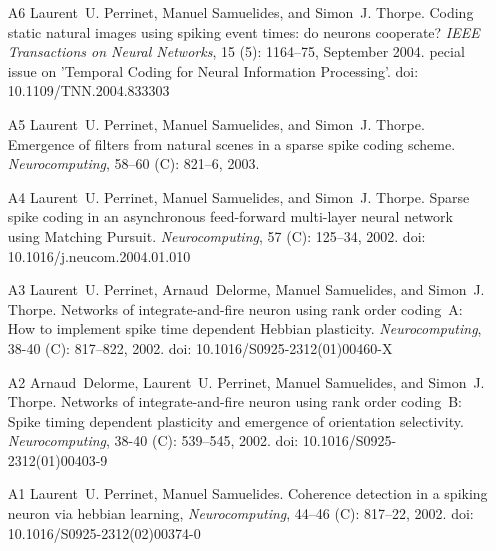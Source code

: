 \documentclass[11pt,french,a4paper,oneside]{article}%
\newcommand{\years}[1]{\marginpar{\textit{\scriptsize #1}}}
\providecommand{\doi}[1]{doi: #1}%
\begin{document}
\begin{enumerate}
\item[A6] %
Laurent~U. Perrinet, Manuel Samuelides, and Simon~J. Thorpe.
\newblock Coding static natural images using spiking event times: do neurons
  cooperate?
\newblock \emph{I{EEE} {T}ransactions on {N}eural {N}etworks}, 15
  (5): 1164--75, September 2004.
pecial issue on '{T}emporal {C}oding for {N}eural {I}nformation
  {P}rocessing'.
\newblock \doi{10.1109/TNN.2004.833303}



\item[A5] %
Laurent~U. Perrinet, \years{2003} Manuel Samuelides, and Simon~J. Thorpe.
\newblock Emergence of filters from natural scenes in a sparse spike coding scheme.
\newblock \emph{Neurocomputing}, 58--60 (C): 821--6, 2003.


\item[A4] %
Laurent~U. Perrinet, \years{2002} Manuel Samuelides, and Simon~J. Thorpe.
\newblock Sparse spike coding in an asynchronous feed-forward multi-layer neural network using {M}atching {P}ursuit.
\newblock \emph{Neurocomputing}, 57 (C): 125--34, 2002.
\newblock \doi{10.1016/j.neucom.2004.01.010}

\item[A3] %
Laurent~U. Perrinet, Arnaud~Delorme, Manuel Samuelides, and Simon~J. Thorpe.
\newblock Networks of integrate-and-fire neuron using rank order coding~A: How to implement spike time dependent Hebbian plasticity.
\newblock \emph{Neurocomputing}, 38-40 (C): 817--822, 2002.
\newblock \doi{10.1016/S0925-2312(01)00460-X}

\item[A2] %
Arnaud~Delorme, Laurent~U. Perrinet, Manuel Samuelides, and Simon~J. Thorpe.
\newblock Networks of integrate-and-fire neuron using rank order coding~B: Spike timing dependent plasticity and emergence of orientation selectivity.
\newblock \emph{Neurocomputing}, 38-40 (C): 539--545, 2002.
\newblock \doi{10.1016/S0925-2312(01)00403-9}

\item[A1] %
Laurent~U. Perrinet, Manuel Samuelides.
\newblock Coherence detection in a spiking neuron via hebbian learning,
\newblock \emph{Neurocomputing}, 44--46 (C): 817--22, 2002.
\newblock \doi{10.1016/S0925-2312(02)00374-0}

\end{enumerate}
\end{document}
